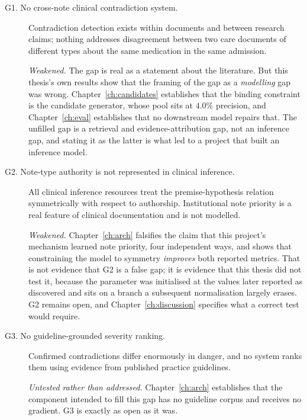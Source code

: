 \begin{description}
\item[G1. No cross-note clinical contradiction system.] Contradiction detection
      exists within documents and between research claims; nothing addresses
      disagreement between two care documents of different types about the same
      medication in the same admission.

      \textit{Weakened.} The gap is real as a statement about the literature.
      But this thesis's own results show that the framing of the gap as a
      \emph{modelling} gap was wrong. Chapter~\ref{ch:candidates} establishes
      that the binding constraint is the candidate generator, whose pool sits at
      $4.0\%$ precision, and Chapter~\ref{ch:eval} establishes that no
      downstream model repairs that. The unfilled gap is a retrieval and
      evidence-attribution gap, not an inference gap, and stating it as the
      latter is what led to a project that built an inference model.

\item[G2. Note-type authority is not represented in clinical inference.] All
      clinical inference resources treat the premise-hypothesis relation
      symmetrically with respect to authorship. Institutional note priority is a
      real feature of clinical documentation and is not modelled.

      \textit{Weakened.} Chapter~\ref{ch:arch} falsifies the claim that this
      project's mechanism learned note priority, four independent ways, and shows
      that constraining the model to symmetry \emph{improves} both reported
      metrics. That is not evidence that G2 is a false gap; it is evidence that
      this thesis did not test it, because the parameter was initialised at the
      values later reported as discovered and sits on a branch a subsequent
      normalisation largely erases. G2 remains open, and
      Chapter~\ref{ch:discussion} specifies what a correct test would require.

\item[G3. No guideline-grounded severity ranking.] Confirmed contradictions
      differ enormously in danger, and no system ranks them using evidence from
      published practice guidelines.

      \textit{Untested rather than addressed.} Chapter~\ref{ch:arch} establishes
      that the component intended to fill this gap has no guideline corpus and
      receives no gradient. G3 is exactly as open as it was.


\end{description}
